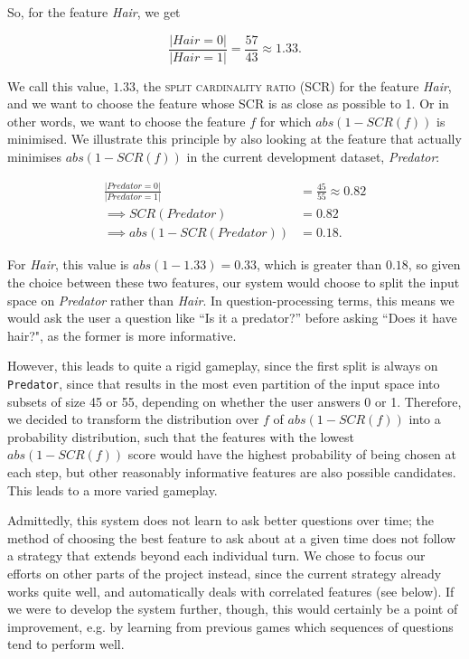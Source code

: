 \documentclass[11pt,a4paper]{article}
\begin{document}
So, for the feature \textit{Hair}, we get

$$\frac{|Hair = 0|}{|Hair = 1|} = \frac{57}{43} \approx 1.33.$$

We call this value, $1.33$, the \textsc{split cardinality ratio} (SCR) for the feature \textit{Hair}, and we want to choose the feature whose SCR is as close as possible to 1.
Or in other words, we want to choose the feature $f$ for which $abs(1 - SCR(f))$ is minimised.
We illustrate this principle by also looking at the feature that actually minimises  $abs(1 - SCR(f))$ in the current development dataset, \textit{Predator}:

\begin{align*}
	\frac{|Predator = 0|}{|Predator = 1|} &= \frac{45}{55} \approx 0.82 \\
	\implies SCR(Predator) & = 0.82\\
	\implies abs(1 - SCR(Predator)) &= 0.18.
\end{align*}

For \textit{Hair}, this value is $abs(1 - 1.33) = 0.33$, which is greater than $0.18$, so given the choice between these two features, our system would choose to split the input space on \textit{Predator} rather than \textit{Hair}.
In question-processing terms, this means we would ask the user a question like ``Is it a predator?'' before asking ``Does it have hair?", as the former is more informative.

However, this leads to quite a rigid gameplay, since the first split is always on \texttt{Predator}, since that results in the most even partition of the input space into subsets of size 45 or 55, depending on whether the user answers 0 or 1.
Therefore, we decided to transform the distribution over $f$ of $abs(1 - SCR(f))$ into a probability distribution, such that the features with the lowest $abs(1 - SCR(f))$ score would have the highest probability of being chosen at each step, but other reasonably informative features are also possible candidates.
This leads to a more varied gameplay.

Admittedly, this system does not learn to ask better questions over time; the method of choosing the best feature to ask about at a given time does not follow a strategy that extends beyond each individual turn.
We chose to focus our efforts on other parts of the project instead, since the current strategy already works quite well, and automatically deals with correlated features (see below).
If we were to develop the system further, though, this would certainly be a point of improvement, e.g. by learning from previous games which sequences of questions tend to perform well.
\end{document}
